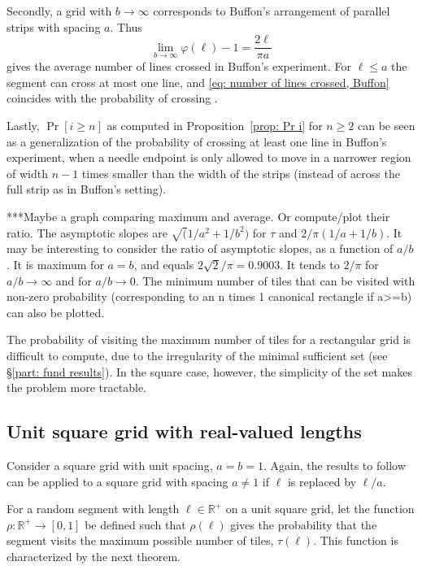 \documentclass[12pt, a4paper]{article}
\newcommand{\funt}{\tau} %
\newcommand{\funta}{\varphi} %
\newcommand{\probmax}{\rho} %
\newcommand{\len}{\ell} %
\begin{document}
Secondly, a grid with $b \rightarrow \infty$ corresponds to Buffon's arrangement of parallel strips with spacing $a$. Thus
\begin{equation}
\label{eq: number of lines crossed, Buffon}
\lim_{b \rightarrow \infty} \funta(\len)-1 = \frac{2\len}{\pi a}
\end{equation}
gives the average number of lines crossed in Buffon's experiment. For $\len \leq a$ the segment can cross at most one line, and \eqref{eq: number of lines crossed, Buffon} coincides with the probability of crossing \cite[section 1.1]{Mathai99}.

Lastly, $\Pr[i \geq n]$ as computed in Proposition~\ref{prop: Pr i} for $n \geq 2$ can be seen as a generalization of the probability of crossing at least one line in Buffon's experiment, when a needle endpoint is only allowed to move in a narrower region of width $n-1$ times smaller than the width of the strips (instead of across the full strip as in Buffon's setting).

***Maybe a graph comparing maximum and average. Or compute/plot their ratio. The asymptotic slopes are $\sqrt(1/a^2+1/b^2)$ for $\funt$ and $2/\pi(1/a+1/b)$. It may be interesting to consider the ratio of asymptotic slopes, as a function of $a/b$. It is maximum for $a=b$, and equals $2\sqrt 2/\pi = 0.9003$. It tends to $2/\pi$ for $a/b \rightarrow \infty$ and for $a/b \rightarrow 0$. The minimum number of tiles that can be visited with non-zero probability (corresponding to an n times 1 canonical rectangle if a>=b) can also be plotted.

The probability of visiting the maximum number of tiles for a rectangular grid is difficult to compute, due to the irregularity of the minimal sufficient set (see \S\ref{part: fund results}). In the square case, however, the simplicity of the set makes the problem more tractable. 


\subsection{Unit square grid with real-valued lengths}
\label{part: probmax: unit square grid, real lengths}

Consider a square grid with unit spacing, $a=b=1$. Again, the results to follow can be applied to a square grid with spacing $a \neq 1$ if $\len$ is replaced by $\len/a$.

For a random segment with length $\len \in \mathbb R^+$ on a unit square grid, let the function $\probmax: \mathbb R^+ \to [0,1]$ be defined such that $\probmax(\len)$ gives the probability that the segment visits the maximum possible number of tiles, $\funt(\len)$. This function is characterized by the next theorem.
\end{document}
